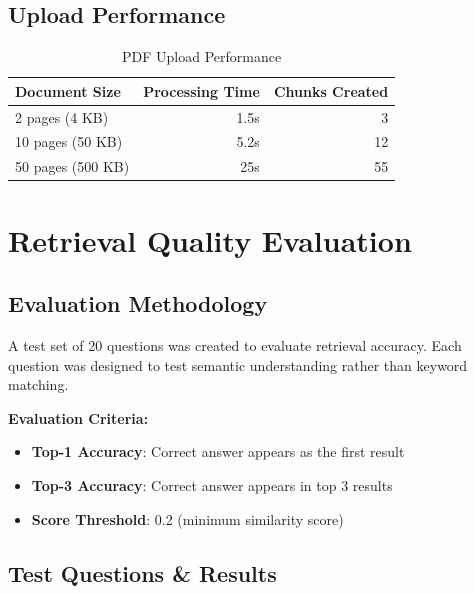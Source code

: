 \documentclass[11pt,a4paper]{article}
\begin{document}
\subsection{Upload Performance}

\begin{table}[H]
\centering
\begin{tabular}{lrr}
\toprule
\textbf{Document Size} & \textbf{Processing Time} & \textbf{Chunks Created} \\
\midrule
2 pages (4 KB) & 1.5s & 3 \\
10 pages (50 KB) & 5.2s & 12 \\
50 pages (500 KB) & 25s & 55 \\
\bottomrule
\end{tabular}
\caption{PDF Upload Performance}
\end{table}

\section{Retrieval Quality Evaluation}

\subsection{Evaluation Methodology}

A test set of 20 questions was created to evaluate retrieval accuracy. Each question was designed to test semantic understanding rather than keyword matching.

\textbf{Evaluation Criteria:}
\begin{itemize}
    \item \textbf{Top-1 Accuracy}: Correct answer appears as the first result
    \item \textbf{Top-3 Accuracy}: Correct answer appears in top 3 results
    \item \textbf{Score Threshold}: 0.2 (minimum similarity score)
\end{itemize}

\subsection{Test Questions \& Results}
\end{document}
